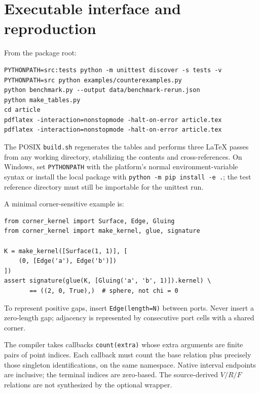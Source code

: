 \documentclass[11pt]{article}
\theoremstyle{definition}
\theoremstyle{remark}\newtheorem{remark}[theorem]{Remark}
\newcommand{\code}[1]{\texttt{#1}}
\begin{document}
\appendix
\section{Executable interface and reproduction}
\label{app:reproduce}
From the package root:
\begin{verbatim}
PYTHONPATH=src:tests python -m unittest discover -s tests -v
PYTHONPATH=src python examples/counterexamples.py
python benchmark.py --output data/benchmark-rerun.json
python make_tables.py
cd article
pdflatex -interaction=nonstopmode -halt-on-error article.tex
pdflatex -interaction=nonstopmode -halt-on-error article.tex
\end{verbatim}
The POSIX \code{build.sh} regenerates the tables and performs three LaTeX passes from any working directory, stabilizing the contents and cross-references. On Windows, set \code{PYTHONPATH} with the platform's normal environment-variable syntax or install the local package with \code{python -m pip install -e .}; the test reference directory must still be importable for the unittest run.

A minimal corner-sensitive example is:
\begin{verbatim}
from corner_kernel import Surface, Edge, Gluing
from corner_kernel import make_kernel, glue, signature

K = make_kernel([Surface(1, 1)], [
    (0, [Edge('a'), Edge('b')])
])
assert signature(glue(K, [Gluing('a', 'b', 1)]).kernel) \
       == ((2, 0, True),)  # sphere, not chi = 0
\end{verbatim}
To represent positive gaps, insert \code{Edge(length=N)} between ports. Never insert a zero-length gap; adjacency is represented by consecutive port cells with a shared corner.

The compiler takes callbacks \code{count(extra)} whose extra arguments are finite pairs of point indices. Each callback must count the base relation plus precisely those singleton identifications, on the same namespace. Native interval endpoints are inclusive; the terminal indices are zero-based. The source-derived $V/R/F$ relations are not synthesized by the optional wrapper.
\end{document}
